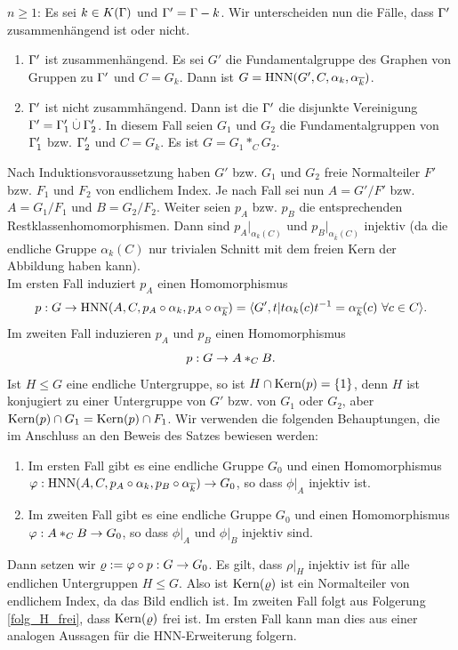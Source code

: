 \documentclass[a4paper, 12pt, twoside]{article}
\begin{document}
$n\geq 1$: Es sei $k\in K(\Gamma)$ und $\Gamma'=\Gamma-k$.
Wir unterscheiden nun die Fälle, dass $\Gamma'$ zusammenhängend ist
oder nicht.
\begin{enumerate}
\item $\Gamma'$ ist zusammenhängend. Es sei $G'$ die
Fundamentalgruppe des Graphen von Gruppen zu $\Gamma'$ und $C=G_k$.
Dann ist $G=\mathrm{HNN}(G',C,\alpha_k,\alpha_{\overline{k}})$.
\item $\Gamma'$ ist nicht zusammhängend. Dann ist die $\Gamma'$
die disjunkte Vereinigung $\Gamma'=\Gamma'_1 \overset{.}{\cup} \Gamma'_2$.
In diesem Fall seien $G_1$ und $G_2$ die Fundamentalgruppen von
$\Gamma'_1$ bzw. $\Gamma'_2$ und $C=G_k$.
Es ist $G=G_1 *_C G_2$.
\end{enumerate}
Nach Induktionsvoraussetzung haben $G'$ bzw. $G_1$ und $G_2$ freie
Normalteiler $F'$ bzw. $F_1$ und $F_2$ von endlichem Index.
Je nach Fall sei nun $A=G'/F'$ bzw. $A=G_1/F_1$ und $B=G_2/F_2$.
Weiter seien $p_A$ bzw. $p_B$ die entsprechenden 
Restklassenhomomorphismen. Dann sind $p_A|_{\alpha_k(C)}$ und
$p_B|_{\alpha_{\bar{k}}(C)}$ injektiv (da die endliche Gruppe
$\alpha_k(C)$ nur trivialen Schnitt mit dem freien Kern der
Abbildung haben kann).\\
Im ersten Fall induziert $p_A$ einen Homomorphismus
\[
p:G\rightarrow\mathrm{HNN}(A,C,p_A\circ\alpha_k,p_A\circ\alpha_{\overline{k}})
=
\langle G',t | t\alpha_k(c) t^{-1}=\alpha_{\overline{k}}(c)\
\forall c\in C\rangle.
\]
Im zweiten Fall induzieren $p_A$ und $p_B$ einen Homomorphismus
\[
p:G\rightarrow A *_C B.
\]
Ist $H\leq G$ eine endliche Untergruppe, so ist $H\cap\mathrm{Kern}(p)=\{1\}$,
denn $H$ ist konjugiert zu einer Untergruppe von $G'$ bzw. von 
$G_1$ oder $G_2$, aber $\mathrm{Kern}(p)\cap G_1=\mathrm{Kern}(p)\cap F_1$.
Wir verwenden die folgenden Behauptungen, die im Anschluss an den
Beweis des Satzes bewiesen werden:
\begin{enumerate}
\item Im ersten Fall gibt es eine endliche Gruppe $G_0$ und einen
Homomorphismus
$\varphi:\mathrm{HNN}(A,C,p_A\circ\alpha_k,p_B\circ\alpha_{\overline{k}})\rightarrow G_0$,
so dass $\phi|_A$ injektiv ist.
\item Im zweiten Fall gibt es eine endliche Gruppe $G_0$ und einen
Homomorphismus $\varphi:A*_C B\rightarrow G_0$, so dass $\phi|_A$ und $\phi|_B$
injektiv sind.
\end{enumerate}
Dann setzen wir $\varrho:=\varphi\circ p:G\rightarrow G_0$. Es gilt, dass $\rho|_H$
injektiv ist für alle endlichen Untergruppen $H\leq G$.
Also ist $\mathrm{Kern}(\varrho)$ ist ein Normalteiler von endlichem Index,
da das Bild endlich ist. Im zweiten Fall folgt aus
Folgerung \ref{folg_H_frei}, dass $\mathrm{Kern}(\varrho)$ frei ist.
Im ersten Fall kann man dies aus einer analogen Aussagen für
die HNN-Erweiterung folgern.
\end{document}

